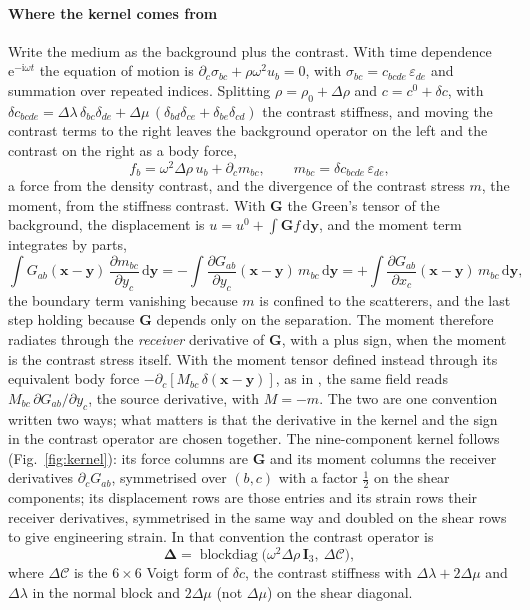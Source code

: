 \documentclass[preprint,review,12pt]{elsarticle}
\newcommand{\bI}{\mathbf{I}}
\newcommand{\bD}{\boldsymbol{\Delta}}
\newcommand{\bG}{\mathbf{G}}
\newcommand{\dd}{\mathrm{d}}
\begin{document}
\paragraph{Where the kernel comes from} Write the medium as the background plus the contrast. With
time dependence $\mathrm{e}^{-\mathrm{i}\omega t}$ the equation of motion is
$\partial_c\sigma_{bc}+\rho\omega^2u_b=0$, with $\sigma_{bc}=c_{bcde}\,\varepsilon_{de}$ and
summation over repeated indices. Splitting $\rho=\rho_0+\Delta\rho$ and $c=c^0+\delta c$, with
$\delta c_{bcde}=\Delta\lambda\,\delta_{bc}\delta_{de}+\Delta\mu\,(\delta_{bd}\delta_{ce}+\delta_{be}\delta_{cd})$
the contrast stiffness, and moving the contrast terms to the right leaves the background operator on
the left and the contrast on the right as a body force,
\begin{equation}\label{eq:bodyforce}
  f_b=\omega^2\Delta\rho\,u_b+\partial_c m_{bc},\qquad m_{bc}=\delta c_{bcde}\,\varepsilon_{de},
\end{equation}
a force from the density contrast, and the divergence of the contrast stress $m$, the moment, from
the stiffness contrast. With $\bG$ the Green's tensor of the background, the displacement is
$u=u^0+\int\bG f\,\dd\mathbf y$, and the moment term integrates by parts,
\begin{equation}\label{eq:byparts}
  \int G_{ab}(\mathbf x-\mathbf y)\,\frac{\partial m_{bc}}{\partial y_c}\,\dd\mathbf y
  =-\int\frac{\partial G_{ab}}{\partial y_c}(\mathbf x-\mathbf y)\,m_{bc}\,\dd\mathbf y
  =+\int\frac{\partial G_{ab}}{\partial x_c}(\mathbf x-\mathbf y)\,m_{bc}\,\dd\mathbf y ,
\end{equation}
the boundary term vanishing because $m$ is confined to the scatterers, and the last step holding
because $\bG$ depends only on the separation. The moment therefore radiates through the
\emph{receiver} derivative of $\bG$, with a plus sign, when the moment is the contrast stress
itself. With the moment tensor defined instead through its equivalent body force
$-\partial_c[M_{bc}\,\delta(\mathbf x-\mathbf y)]$, as in \citet{Aki2002}, the same field reads
$M_{bc}\,\partial G_{ab}/\partial y_c$, the source derivative, with $M=-m$. The two are one
convention written two ways; what matters is that the derivative in the kernel and the sign in the
contrast operator are chosen together. The nine-component kernel follows (Fig.~\ref{fig:kernel}): its force columns are
$\bG$ and its moment columns the receiver derivatives $\partial_cG_{ab}$, symmetrised over $(b,c)$
with a factor $\tfrac12$ on the shear components; its displacement rows are those entries and its
strain rows their receiver derivatives, symmetrised in the same way and doubled on the shear rows to
give engineering strain. In that convention the contrast operator is
\begin{equation}\label{eq:delta}
  \bD=\operatorname{blockdiag}\!\bigl(\omega^2\Delta\rho\,\bI_3,\ \Delta\mathcal{C}\bigr),
\end{equation}
where $\Delta\mathcal{C}$ is the $6\times6$ Voigt form of $\delta c$, the contrast stiffness with $\Delta\lambda+2\Delta\mu$ and
$\Delta\lambda$ in the normal block and $2\Delta\mu$ (not $\Delta\mu$) on the shear diagonal.
\end{document}
